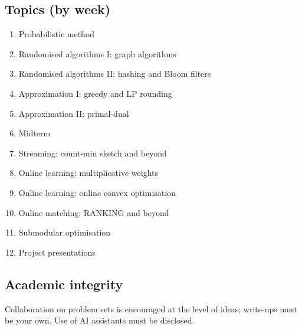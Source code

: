 \documentclass{article}
\begin{document}
\subsection*{Topics (by week)}
\begin{enumerate}[noitemsep]
  \item Probabilistic method
  \item Randomised algorithms I: graph algorithms
  \item Randomised algorithms II: hashing and Bloom filters
  \item Approximation I: greedy and LP rounding
  \item Approximation II: primal-dual
  \item Midterm
  \item Streaming: count-min sketch and beyond
  \item Online learning: multiplicative weights
  \item Online learning: online convex optimisation
  \item Online matching: RANKING and beyond
  \item Submodular optimisation
  \item Project presentations
\end{enumerate}

\subsection*{Academic integrity}
Collaboration on problem sets is encouraged at the level of ideas; write-ups must be your own. Use of AI assistants must be disclosed.
\end{document}
